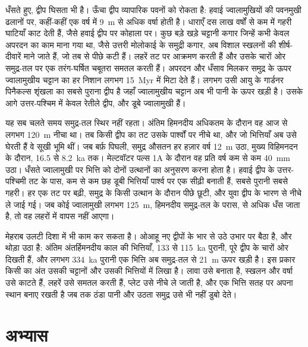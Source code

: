 धँसते हुए, द्वीप घिसता भी है। ऊँचा द्वीप व्यापारिक पवनों को रोकता है: हवाई ज्वालामुखियों की
पवनमुखी ढलानों पर, कहीं-कहीं एक वर्ष में \qty{9}{m} से अधिक वर्षा होती है।
धाराएँ दस लाख वर्षों से कम में गहरी घाटियाँ काट देती हैं, जैसे हवाई द्वीप पर कोहाला पर।
कुछ बड़े खड़े चट्टानी कगार जिन्हें कभी केवल अपरदन का काम माना गया था, जैसे उत्तरी
मोलोकाई के समुद्री कगार, अब विशाल स्खलनों की शीर्ष-दीवारें माने जाते हैं, जो तब से पीछे कटी हैं। लहरें तट पर आक्रमण करती हैं और
उसके चारों ओर समुद्र-तल पर एक तरंग-घर्षित चबूतरा समतल करती हैं। अपरदन और धँसाव मिलकर समुद्र के ऊपर
ज्वालामुखीय चट्टान का हर निशान लगभग \qty{15}{Myr} में मिटा देते हैं। लगभग उसी आयु के गार्डनर पिनैकल्स
शृंखला का सबसे पुराना द्वीप है जहाँ ज्वालामुखीय चट्टान अब भी पानी के ऊपर खड़ी है। उसके आगे
उत्तर-पश्चिम में केवल रेतीले द्वीप,  और डूबे ज्वालामुखी हैं।

यह सब चलते समय समुद्र-तल स्थिर नहीं रहता। अंतिम हिमनदीय अधिकतम के दौरान वह आज से लगभग
\qty{120}{m} नीचा था। तब किसी द्वीप का तट उसके पार्श्वों पर नीचे था, और जो भित्तियाँ
अब उसे घेरती हैं वे सूखी भूमि थीं। जब बर्फ़ पिघली, समुद्र औसतन हर हज़ार वर्ष \qty{12}{m} उठा, मुख्य विहिमनदन के दौरान,
16.5 से \qty{8.2}{ka} तक। मेल्टवॉटर
पल्स 1A के दौरान वह प्रति वर्ष कम से कम \qty{40}{mm} उठा। धँसते ज्वालामुखी पर भित्ति को दोनों
उत्थानों का अनुसरण करना होता है। हवाई द्वीप के उत्तर-पश्चिमी तट के पास, कम से कम छह डूबी भित्तियाँ
पार्श्व पर एक सीढ़ी बनाती हैं, सबसे पुरानी सबसे गहरी। हर एक तट पर बढ़ी, समुद्र के किसी उत्थान के दौरान
पीछे छूटी, और युवा द्वीप के भारण से नीचे ले जाई गई। जब कोई ज्वालामुखी
लगभग \qty{125}{m}, हिमनदीय समुद्र-तल के परास, से अधिक धँस जाता है, तो वह लहरों में वापस नहीं आएगा।

मेहराब उलटी दिशा में भी काम कर सकता है। ओआहू नए द्वीपों के भार से उठे उभार पर बैठा है,
और थोड़ा उठा है: अंतिम अंतर्हिमनदीय काल की भित्तियाँ, 133 से \qty{115}{ka} पुरानी, पूरे
द्वीप के चारों ओर दिखती हैं, और लगभग \qty{334}{ka} पुरानी एक भित्ति अब समुद्र-तल से \qty{21}{m} ऊपर खड़ी है। इस प्रकार
किसी  का अंत उसकी चट्टानों और उसकी भित्तियों में लिखा है। लावा उसे बनाता है, स्खलन और
वर्षा उसे काटते हैं, लहरें उसे समतल करती हैं, प्लेट उसे नीचे ले जाती है, और एक भित्ति सतह पर अपना स्थान
बनाए रखती है जब तक ठंडा पानी और उठता समुद्र उसे भी नहीं डुबो देते।

\section*{अभ्यास}\label{sec:b2:oceanic-islands:exercises}

